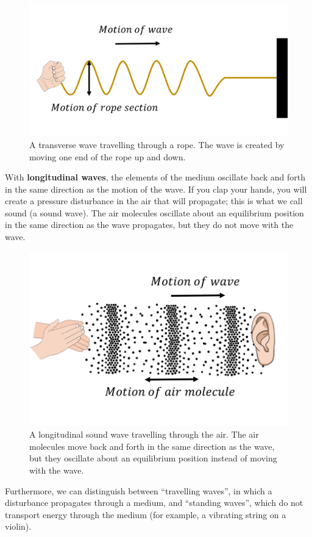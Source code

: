 \begin{figure}[!htbp]
\centering
\includegraphics[width=0.6\linewidth]{files/rope-0b107780d3edd953a01b4e92cb37aad2.png}
\caption[]{A transverse wave travelling through a rope. The wave is created by moving one end of the rope up and down.}
\label{fig:waves:rope}
\end{figure}

With \textbf{longitudinal waves}, the elements of the medium oscillate back and forth in the same direction as the motion of the wave. If you clap your hands, you will create a pressure disturbance in the air that will propagate; this is what we call sound (a sound wave). The air molecules oscillate about an equilibrium position in the same direction as the wave propagates, but they do not move with the wave.

\begin{figure}[!htbp]
\centering
\includegraphics[width=0.6\linewidth]{files/sound-13b08117b78a8ef141b2742713c472cf.png}
\caption[]{A longitudinal sound wave travelling through the air. The air molecules move back and forth in the same direction as the wave, but they oscillate about an equilibrium position instead of moving with the wave.}
\label{fig:waves:sound}
\end{figure}

Furthermore, we can distinguish between ``travelling waves'', in which a disturbance propagates through a medium, and ``standing waves'', which do not transport energy through the medium (for example, a vibrating string on a violin).

